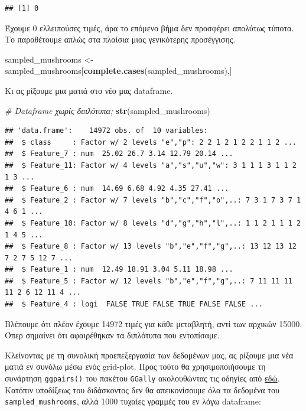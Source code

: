 \documentclass[
]{article}
\newenvironment{Shaded}{\begin{snugshade}}{\end{snugshade}}
\newcommand{\CommentTok}[1]{\textcolor[rgb]{0.56,0.35,0.01}{\textit{#1}}}
\newcommand{\FunctionTok}[1]{\textcolor[rgb]{0.13,0.29,0.53}{\textbf{#1}}}
\newcommand{\NormalTok}[1]{#1}
\newcommand{\OtherTok}[1]{\textcolor[rgb]{0.56,0.35,0.01}{#1}}
\begin{document}
\begin{verbatim}
## [1] 0
\end{verbatim}

Έχουμε 0 ελλειπούσες τιμές, άρα το επόμενο βήμα δεν προσφέρει απολύτως
τύποτα. Το παραθέτουμε απλώς στα πλαίσια μιας γενικότερης προσέγγισης.

\begin{Shaded}
\begin{Highlighting}[]
\NormalTok{sampled\_mushrooms }\OtherTok{\textless{}{-}}\NormalTok{ sampled\_mushrooms[}\FunctionTok{complete.cases}\NormalTok{(sampled\_mushrooms),]}
\end{Highlighting}
\end{Shaded}

Κι ας ρίξουμε μια ματιά στο νέο μας dataframe.

\begin{Shaded}
\begin{Highlighting}[]
\CommentTok{\# Dataframe χωρίς διπλότυπα;}
\FunctionTok{str}\NormalTok{(sampled\_mushrooms)}
\end{Highlighting}
\end{Shaded}

\begin{verbatim}
## 'data.frame':    14972 obs. of  10 variables:
##  $ class     : Factor w/ 2 levels "e","p": 2 2 1 2 1 2 2 1 1 2 ...
##  $ Feature_7 : num  25.02 26.7 3.14 12.79 20.14 ...
##  $ Feature_11: Factor w/ 4 levels "a","s","u","w": 3 1 1 1 3 1 1 2 1 3 ...
##  $ Feature_6 : num  14.69 6.68 4.92 4.35 27.41 ...
##  $ Feature_2 : Factor w/ 7 levels "b","c","f","o",..: 7 3 1 7 3 7 1 4 6 1 ...
##  $ Feature_10: Factor w/ 8 levels "d","g","h","l",..: 1 1 2 1 1 1 2 1 4 5 ...
##  $ Feature_8 : Factor w/ 13 levels "b","e","f","g",..: 13 12 13 12 7 2 7 5 12 7 ...
##  $ Feature_1 : num  12.49 18.91 3.04 5.11 18.98 ...
##  $ Feature_5 : Factor w/ 12 levels "b","e","f","g",..: 7 11 11 11 11 2 6 12 11 4 ...
##  $ Feature_4 : logi  FALSE TRUE FALSE TRUE FALSE FALSE ...
\end{verbatim}

Βλέπουμε ότι πλέον έχουμε 14972 τιμές για κάθε μεταβλητή, αντί των
αρχικών 15000. Όπερ σημαίνει ότι αφαιρέθηκαν τα διπλότυπα που
εντοπίσαμε.

Κλείνοντας με τη συνολική προεπεξεργασία των δεδομένων μας, ας ρίξουμε
μια νέα ματιά εν συνόλω μέσω ενός grid-plot. Προς τούτο θα
χρησιμοποιήσουμε τη συνάρτηση \texttt{ggpairs()} του πακέτου
\texttt{GGally} ακολουθώντας τις οδηγίες από
\href{https://ggobi.github.io/ggally/articles/ggpairs.html}{εδώ}.
Κατόπιν υποδίξεως του διδάσκοντος δεν θα απεικονίσουμε όλα τα δεδομένα
του \texttt{sampled\_mushrooms}, αλλά 1000 τυχαίες γραμμές του εν λόγω
dataframe:
\end{document}
